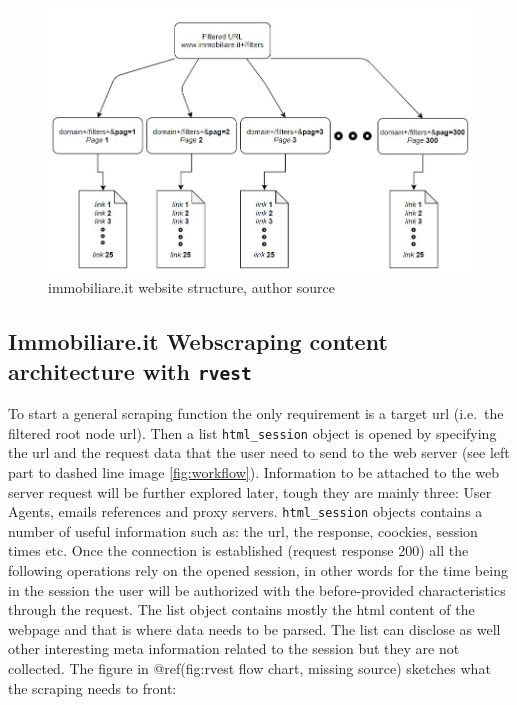 \documentclass[
  12pt,
  a4paper,
  oneside]{book}
\theoremstyle{definition}
\theoremstyle{definition}
\theoremstyle{definition}
\theoremstyle{remark}
\begin{document}
\begin{figure}
\hypertarget{fig:website_tree1}{%
\centering
\includegraphics{images/website_tree1.jpg}
\caption{immobiliare.it website structure, author source}\label{fig:website_tree1}
}
\end{figure}

\hypertarget{immobiliare.it-webscraping-content-architecture-with-rvest}{%
\subsection{\texorpdfstring{Immobiliare.it Webscraping content architecture with \texttt{rvest}}{Immobiliare.it Webscraping content architecture with rvest}}\label{immobiliare.it-webscraping-content-architecture-with-rvest}}

To start a general scraping function the only requirement is a target url (i.e.~the filtered root node url). Then a list \texttt{html\_session} object is opened by specifying the url and the request data that the user need to send to the web server (see left part to dashed line image \ref{fig:workflow}). Information to be attached to the web server request will be further explored later, tough they are mainly three: User Agents, emails references and proxy servers. \texttt{html\_session} objects contains a number of useful information such as: the url, the response, coockies, session times etc. Once the connection is established (request response 200) all the following operations rely on the opened session, in other words for the time being in the session the user will be authorized with the before-provided characteristics through the request.
The list object contains mostly the html content of the webpage and that is where data needs to be parsed. The list can disclose as well other interesting meta information related to the session but they are not collected.
The figure in @ref(fig:rvest flow chart, missing source) sketches what the scraping needs to front:
\end{document}
